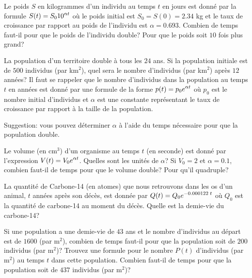 \begin{question}
Le poids $S$ en kilogrammes d'un individu au temps $t$ en jours est
donné par la formule $\displaystyle S(t) = S_0 10^{\alpha t}$ où le
poids initial est $S_0 = S(0) = 2.34$ kg et le taux de croissance
par rapport au poids de l'individu est $\alpha = 0.693$.  Combien de temps
faut-il pour que le poids de l'individu double?  Pour que le poids
soit $10$ fois plus grand?
\label{2Q27}
\end{question}

\begin{question}
La population d'un territoire double à tous les $24$ ans.  Si la
population initiale est de $500$ individus (par km$^2$), quel sera le
nombre d'individus (par km$^2$) après $12$ années? Il faut se rappeler
que le nombre d'individus dans la population au temps $t$ en années
est donné par une formule de la forme
$\displaystyle p(t) = p_0 e^{\alpha t}$ où $p_0$ est le nombre initial
d'individus et $\alpha$ est une constante représentant le taux de
croissance par rapport à la taille de la population.

Suggestion: vous pouvez déterminer $\alpha$ à l'aide du temps
nécessaire pour que la population double.
\label{2Q28}
\end{question}

\begin{question}
Le volume (en cm$^3$) d'un organisme au temps $t$ (en seconde) est
donné par l'expression $\displaystyle V(t) = V_0 e^{\alpha t}$.  Quelles sont les
unités de $\alpha$?  Si $V_0 = 2$ et $\alpha = 0.1$, combien faut-il
de temps pour que le volume double?  Pour qu'il quadruple?
\label{2Q29}
\end{question}

\begin{question}
La quantité de Carbone-14 (en atomes) que nous retrouvons dans les os
d'un animal, $t$ années après son décès, est donnée par
$\displaystyle Q(t) = Q_0 e^{-0.000122\; t}$ où $Q_0$ est la quantité de
carbone-14 au moment du décès.  Quelle est la demie-vie du carbone-14?
\label{2Q30}
\end{question}

\begin{question}
Si une population a une demie-vie de $43$ ans et le nombre d'individus
au départ est de $1600$ (par m$^2$), combien de temps faut-il pour que
la population soit de $200$ individus (par m$^2$)?  Trouvez une
formule pour le nombre $P(t)$ d'individus (par m$^2$) au temps $t$
dans cette population.  Combien faut-il de temps pour que la
population soit de $437$ individus (par m$^2$)?
\label{2Q31}
\end{question}

